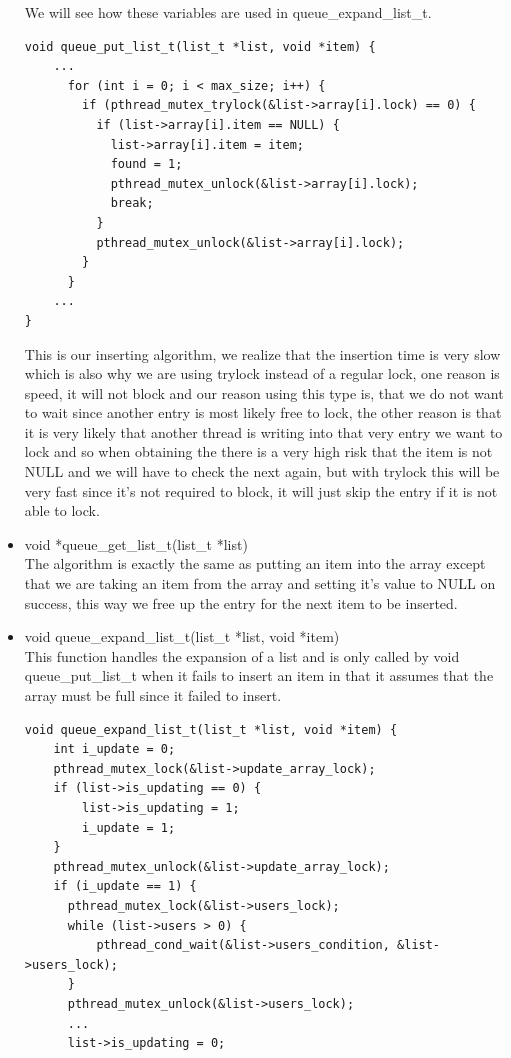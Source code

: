 \documentclass[a4paper,12pt,danish]{report}
\begin{document}
\begin{itemize}
   We will see how these variables are used in queue\_expand\_list\_t.
\newpage
\begin{lstlisting}
void queue_put_list_t(list_t *list, void *item) {
    ...
      for (int i = 0; i < max_size; i++) {
        if (pthread_mutex_trylock(&list->array[i].lock) == 0) {
          if (list->array[i].item == NULL) {
            list->array[i].item = item;
            found = 1;
            pthread_mutex_unlock(&list->array[i].lock);
            break;
          }
          pthread_mutex_unlock(&list->array[i].lock);
        }
      }
    ...
}
\end{lstlisting}
This is our inserting algorithm, we realize that the insertion time is very slow which is also why we are using trylock instead of a regular lock, one reason is speed, it will not block and our reason using this type is, that we do not want to wait since another entry is most likely free to lock, the other reason is that it is very likely that another thread is writing into that very entry we want to lock and so when obtaining the there is a very high risk that the item is not NULL and we will have to check the next again, but with trylock this will be very fast since it's not required to block, it will just skip the entry if it is not able to lock.
  \item{void *queue\_get\_list\_t(list\_t *list)}
  \\
  The algorithm is exactly the same as putting an item into the array except that we are taking an item from the array and setting it's value to NULL on success, this way we free up the entry for the next item to be inserted.
  \item{void queue\_expand\_list\_t(list\_t *list, void *item)}
  \\
  This function handles the expansion of a list and is only called by void queue\_put\_list\_t when it fails to insert an item in that it assumes that the array must be full since it failed to insert.
\newpage
\begin{lstlisting}
void queue_expand_list_t(list_t *list, void *item) {
    int i_update = 0;
    pthread_mutex_lock(&list->update_array_lock);
    if (list->is_updating == 0) {
        list->is_updating = 1;
        i_update = 1;
    }
    pthread_mutex_unlock(&list->update_array_lock);
    if (i_update == 1) {
      pthread_mutex_lock(&list->users_lock);
      while (list->users > 0) {
          pthread_cond_wait(&list->users_condition, &list->users_lock);
      }
      pthread_mutex_unlock(&list->users_lock);
      ...
      list->is_updating = 0;

\end{lstlisting}
\end{itemize}
\end{document}
